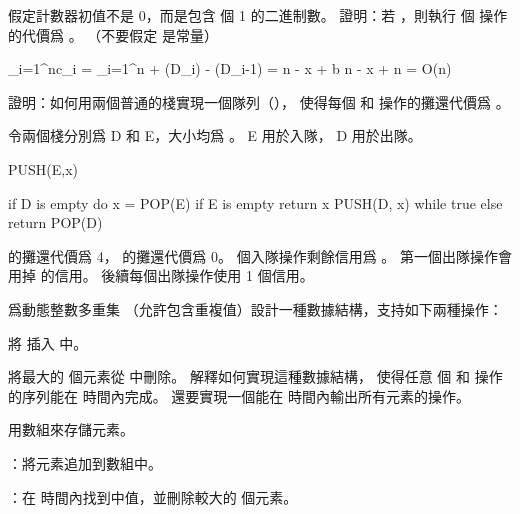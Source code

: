 \startEXERCISE
假定計數器初值不是 0，而是包含  個 1 的二進制數。
證明：若 ，則執行  個  操作的代價爲 。
（不要假定  是常量）
\stopEXERCISE

\startANSWER
\startformula\startmathalignment
\NC \sum_{i=1}^{n}c_i \NC = \sum_{i=1}^{n} + \Phi(D_i) - \Phi(D_{i-1}) \NR
\NC \NC = n - x + b \NR
\NC \NC \le n - x + n \NR
\NC \NC = O(n) \NR
\stopmathalignment\stopformula
\stopANSWER

\startEXERCISE
證明：如何用兩個普通的棧實現一個隊列（），
使得每個  和  操作的攤還代價爲 。
\stopEXERCISE

\startANSWER
令兩個棧分別爲 D 和 E，大小均爲 。 E 用於入隊， D 用於出隊。

\startCLRS
PUSH(E,x)
\stopCLRS

\startCLRS
if D is empty
	do
		x = POP(E)
		if E is empty
			return x
		PUSH(D, x)
	while true
else
	return POP(D)
\stopCLRS

 的攤還代價爲 4，  的攤還代價爲 0。
  個入隊操作剩餘信用爲 。
第一個出隊操作會用掉  的信用。
後續每個出隊操作使用 1 個信用。
\stopANSWER

\startEXERCISE
爲動態整數多重集  （允許包含重複值）設計一種數據結構，支持如下兩種操作：
\startigBase[2]
\item {} 將  插入  中。
\item {} 將最大的  個元素從  中刪除。
\stopigBase
解釋如何實現這種數據結構，
使得任意  個  和  操作的序列能在  時間內完成。
還要實現一個能在  時間內輸出所有元素的操作。
\stopEXERCISE

\startANSWER
用數組來存儲元素。

：將元素追加到數組中。

：在  時間內找到中值，並刪除較大的  個元素。
\stopANSWER

\stopsection

